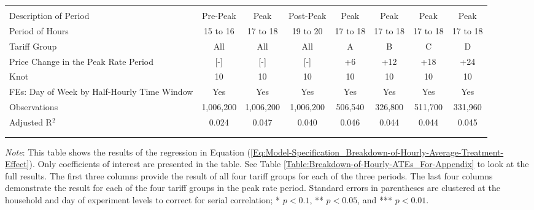 {\begin{sidewaystable}[t!]
\begin{adjustbox}{scale = 0.85}
\begin{threeparttable}
\begin{tabular}{@{\extracolsep{20pt}}lccccccc}
                    & & & & & & & \\
                    \hline
                    \\[-2.0ex]
                    Description of Period & Pre-Peak & Peak & Post-Peak & Peak & Peak & Peak & Peak \\
                    Period of Hours & 15 to 16 & 17 to 18 & 19 to 20 & 17 to 18 & 17 to 18 & 17 to 18 & 17 to 18 \\
                    Tariff Group & All & All & All & A & B & C & D \\
                    Price Change in the Peak Rate Period & [-] & [-] & [-] & +6 & +12 & +18 & +24 \\
                    Knot & 10 & 10 & 10 & 10 & 10 & 10 & 10 \\
                    FEs: Day of Week by Half-Hourly Time Window & Yes & Yes & Yes & Yes & Yes & Yes & Yes \\
                    Observations & 1,006,200 & 1,006,200 & 1,006,200 & 506,540 & 326,800 & 511,700 & 331,960 \\
                    Adjusted R$^{2}$ & 0.024 & 0.047 & 0.040 & 0.046 & 0.044 & 0.044 & 0.045 \\
                    \\[-2.0ex]
                    \hline \hline
                    \\[-4.5ex]
                \end{tabular}
                \begin{tablenotes}[flushleft]
                    \footnotesize
                    \item \textit{Note}: This table shows the results of the regression in Equation (\ref{Eq:Model-Specification_Breakdown-of-Hourly-Average-Treatment-Effect}). Only coefficients of interest are presented in the table. See Table \ref{Table:Breakdown-of-Hourly-ATEs_For-Appendix} to look at the full results. The first three columns provide the result of all four tariff groups for each of the three periods. The last four columns demonstrate the result for each of the four tariff groups in the peak rate period. Standard errors in parentheses are clustered at the household and day of experiment levels to correct for serial correlation; * $p < 0.1$, ** $p < 0.05$, and *** $p < 0.01$.
                \end{tablenotes}
            \end{threeparttable}
        \end{adjustbox}
    \end{sidewaystable}
}
